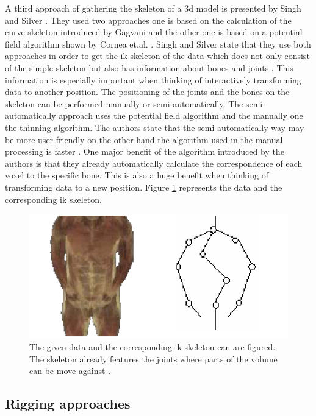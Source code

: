 A third approach of gathering the skeleton of a \gls{3d} model is presented by Singh and Silver \cite{Singh2004}. They used two approaches one is based on the calculation of the curve skeleton introduced by Gagvani \cite{Gagvani1999} and the other one is based on a potential field algorithm shown by Cornea et.al. \cite{Cornea2005ComputingObjects}. Singh and Silver state that they use both approaches in order to get the \gls{ik} skeleton of the data which does not only consist of the simple skeleton but also has information about bones and joints \cite{Singh2004}. This information is especially important when thinking of interactively transforming data to another position. The positioning of the joints and the bones on the skeleton can be performed manually or semi-automatically. The semi-automatically approach uses the potential field algorithm and the manually one the thinning algorithm. The authors state that the semi-automatically way may be more user-friendly on the other hand the algorithm used in the manual processing is faster \cite{Singh2004}. One major benefit of the algorithm introduced by the authors is that they already automatically calculate the correspondence of each voxel to the specific bone. This is also a huge benefit when thinking of transforming data to a new position. Figure \ref{fig:ikskeleton} represents the data and the corresponding \gls{ik} skeleton.

\begin{figure} [htb!]
    \centering
	\includegraphics[width=12cm]{content/images/ikskeleton}
	\caption{The given data and the corresponding \gls{ik} skeleton can are figured. The skeleton already features the joints where parts of the volume can be move against \cite{Singh2004}.}
	\label{fig:ikskeleton}
\end{figure}
\newpage

\subsection{Rigging approaches}


